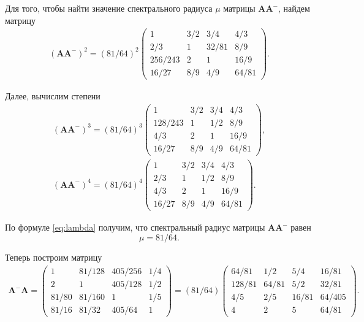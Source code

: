 \documentclass[specialist,
               substylefile = spbu.rtx,
               subf,href,colorlinks=true, 12pt]{disser}
\theoremstyle{definition}
\begin{document}
Для того, чтобы найти значение спектрального радиуса $\mu$ матрицы $\bm{A}\bm{A}^{-}$, найдем матрицу
\begin{gather*}
(\bm{A}\bm{A}^{-})^{2}
=
(81/64)^{2}
\begin{pmatrix}
1 & 3/2 &3/4 &4/3\\
2/3 &1 &32/81 &8/9\\
256/243 &2 &1 &16/9\\
16/27 &8/9 &4/9 &64/81
\end{pmatrix}.
\end{gather*}

Далее, вычислим степени
\begin{gather*}
(\bm{A}\bm{A}^{-})^{3}
=
(81/64)^{3}
\begin{pmatrix}
1 & 3/2 &3/4 &4/3\\
128/243 &1 &1/2 &8/9\\
4/3 &2 &1 &16/9\\
16/27 &8/9 &4/9 &64/81
\end{pmatrix},
\\
(\bm{A}\bm{A}^{-})^{4}
=
(81/64)^{4}
\begin{pmatrix}
1 & 3/2 &3/4 &4/3\\
2/3 &1 &1/2 &8/9\\
4/3 &2 &1 &16/9\\
16/27 &8/9 &4/9 &64/81
\end{pmatrix}.
\end{gather*}

По формуле \eqref{eq:lambda} получим, что спектральный радиус матрицы $\bm{A}\bm{A}^{-}$ равен
\begin{equation*}
\mu=81/64.
\end{equation*}

Теперь построим матрицу
\begin{gather*}
\bm{A}^{-}\bm{A}
=
\begin{pmatrix}
1 &81/128 &405/256 &1/4\\
2 &1 &405/128 &1/2\\
81/80 &81/160 &1 &1/5\\
81/16 &81/32 &405/64 &1
\end{pmatrix}
=
(81/64)
\begin{pmatrix}
64/81 &1/2 &5/4 &16/81\\
128/81 &64/81 &5/2 &32/81\\
4/5 &2/5 &16/81 &64/405\\
4 & 2 &5 &64/81
\end{pmatrix}.
\end{gather*}
\end{document}
